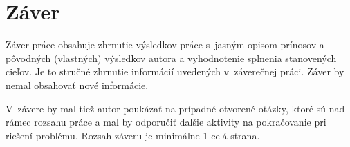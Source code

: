 
\chapter{Záver}\label{ch:summary}

Záver práce obsahuje zhrnutie výsledkov práce s~jasným opisom prínosov a pôvodných (vlastných) výsledkov autora a vyhodnotenie splnenia stanovených cieľov. Je to stručné zhrnutie informácií uvedených v~záverečnej práci. Záver by nemal obsahovať nové informácie.

V~závere by mal tiež autor poukázať na prípadné otvorené otázky, ktoré sú nad rámec rozsahu práce a mal by odporučiť ďalšie aktivity na pokračovanie pri riešení problému. Rozsah záveru je minimálne 1 celá strana.
